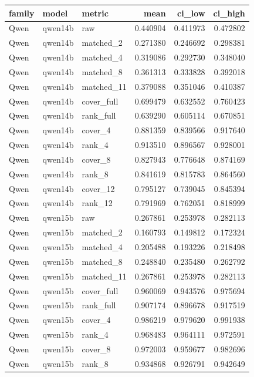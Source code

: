 \begin{tabular}{lllrrr}
\toprule
family & model & metric & mean & ci_low & ci_high \\
\midrule
Qwen & qwen14b & raw & 0.440904 & 0.411973 & 0.472802 \\
Qwen & qwen14b & matched_2 & 0.271380 & 0.246692 & 0.298381 \\
Qwen & qwen14b & matched_4 & 0.319086 & 0.292730 & 0.348040 \\
Qwen & qwen14b & matched_8 & 0.361313 & 0.333828 & 0.392018 \\
Qwen & qwen14b & matched_11 & 0.379088 & 0.351046 & 0.410387 \\
Qwen & qwen14b & cover_full & 0.699479 & 0.632552 & 0.760423 \\
Qwen & qwen14b & rank_full & 0.639290 & 0.605114 & 0.670851 \\
Qwen & qwen14b & cover_4 & 0.881359 & 0.839566 & 0.917640 \\
Qwen & qwen14b & rank_4 & 0.913510 & 0.896567 & 0.928001 \\
Qwen & qwen14b & cover_8 & 0.827943 & 0.776648 & 0.874169 \\
Qwen & qwen14b & rank_8 & 0.841619 & 0.815783 & 0.864560 \\
Qwen & qwen14b & cover_12 & 0.795127 & 0.739045 & 0.845394 \\
Qwen & qwen14b & rank_12 & 0.791969 & 0.762051 & 0.818999 \\
Qwen & qwen15b & raw & 0.267861 & 0.253978 & 0.282113 \\
Qwen & qwen15b & matched_2 & 0.160793 & 0.149812 & 0.172324 \\
Qwen & qwen15b & matched_4 & 0.205488 & 0.193226 & 0.218498 \\
Qwen & qwen15b & matched_8 & 0.248840 & 0.235480 & 0.262792 \\
Qwen & qwen15b & matched_11 & 0.267861 & 0.253978 & 0.282113 \\
Qwen & qwen15b & cover_full & 0.960069 & 0.943576 & 0.975694 \\
Qwen & qwen15b & rank_full & 0.907174 & 0.896678 & 0.917519 \\
Qwen & qwen15b & cover_4 & 0.986219 & 0.979620 & 0.991938 \\
Qwen & qwen15b & rank_4 & 0.968483 & 0.964111 & 0.972591 \\
Qwen & qwen15b & cover_8 & 0.972003 & 0.959677 & 0.982696 \\
Qwen & qwen15b & rank_8 & 0.934868 & 0.926791 & 0.942649 \\

\end{tabular}

